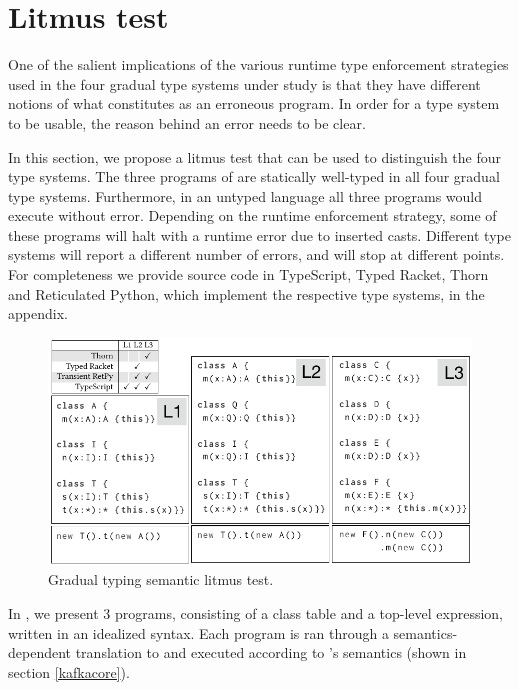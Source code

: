 \documentclass{tex/llncs}
\begin{document}

\section{Litmus test}\label{litmustest}


\vspace{-5mm}

One of the salient implications of the various runtime type enforcement
strategies used in the four gradual type systems under study is that they
have different notions of what constitutes as an erroneous program.
In order for a type system to be usable, the reason behind an error needs to
be clear.

In this section, we propose a litmus test that can be used to distinguish
the four type systems. The three programs of  are statically
well-typed in all four gradual type systems. Furthermore, in an untyped
language all three programs would execute without error. Depending on the
runtime enforcement strategy, some of these programs will halt with a runtime
error due to inserted casts. Different type systems will report a different
number of errors, and will stop at different points. For completeness we
provide source code in TypeScript, Typed Racket, Thorn and Reticulated
Python, which implement the respective type systems, in the appendix.

\begin{figure}[!h]
	\includegraphics[width=.95\columnwidth]{../figures/litm}
	\caption{Gradual typing semantic litmus test.}\label{litmus}
\end{figure}

In , we present 3 programs, consisting of a class table and a
top-level expression, written in an idealized syntax. Each program is ran
through a semantics-dependent translation to \kafka and executed according to
\kafka's semantics (shown in section \ref{kafkacore}).
\end{document}
